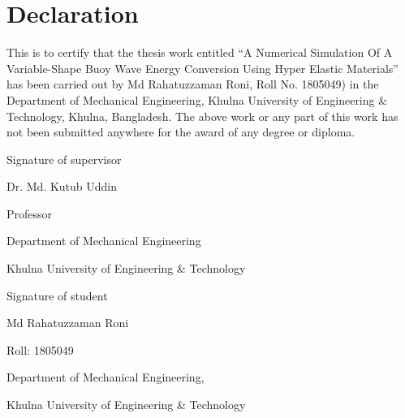 
\section*{\centering\fontsize{14}{16}\selectfont Declaration}
\vspace{3\baselineskip}
\begin{justify}
{\fontsize{12}{14}\selectfont This is to certify that the thesis work entitled “A Numerical Simulation Of A Variable-Shape Buoy Wave Energy Conversion Using Hyper Elastic Materials” has been carried out by Md Rahatuzzaman Roni, Roll No. 1805049) in the Department of Mechanical Engineering, Khulna University of Engineering \& Technology, Khulna, Bangladesh. The above work or any part of this work has not been submitted anywhere for the award of any degree or diploma.}
\end{justify}

\vspace{3\baselineskip}

\begin{multicols}{2} %
    \centering\fontsize{12}{12}\selectfont %
    \underline{\hspace{0.8\linewidth}}\par %
    Signature of supervisor \par
    \vspace{0.5cm} %
    Dr. Md. Kutub Uddin\par
    Professor\par
    Department of Mechanical Engineering\par
Khulna University of Engineering \& Technology
    
    \columnbreak %
    
    \centering %
    \underline{\hspace{0.8\linewidth}}\par %
    Signature of student\par
    \vspace{0.5cm} %
   \textbf{ }Md Rahatuzzaman Roni \par
   Roll: 1805049\par 
   Department of Mechanical Engineering,\par
   Khulna University of Engineering \& Technology
\end{multicols}
\clearpage